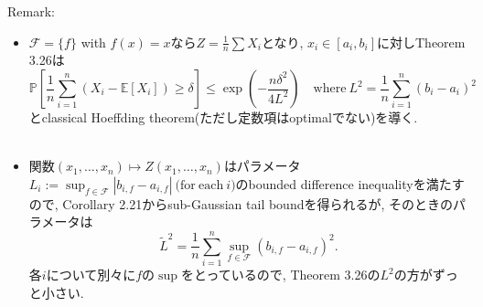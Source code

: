 \documentclass[aspectratio=169, dvipdfmx]{beamer}
\newcommand{\ex}{\mathbb{E}}
\newcommand{\bb}{\mathbb}
\newcommand{\cc}{\mathcal}
\begin{document}
\begin{frame}
    Remark:
    \begin{itemize}
        \item $\cc{F} = \{f\}$ with $f(x) = x$なら$Z = \frac{1}{n}\sum X_i$となり,
        $x_i \in [a_i, b_i]$に対しTheorem 3.26は
        \[
            \bb{P} \left[\frac{1}{n}\sum_{i=1}^n (X_i - \ex[X_i]) \ge \delta\right]
            \le \exp\left(-\frac{n\delta^2}{4L^2}\right)
            \quad \mathrm{where\ } L^2 = \frac{1}{n}\sum_{i=1}^n (b_i-a_i)^2
        \]
        とclassical Hoeffding theorem(ただし定数項はoptimalでない)を導く.\\
        　
        \item 関数$(x_1, \dots, x_n) \mapsto Z(x_1,\dots,x_n)$はパラメータ$L_i := \sup_{f \in \cc{F}}|b_{i,f}-a_{i,f}|\ \mathrm{(for\ each\ } i\mathrm{)}$のbounded difference inequalityを満たすので,
        Corollary 2.21からsub-Gaussian tail boundを得られるが, そのときのパラメータは
        \[
            \tilde{L}^2 
            = \frac{1}{n}\sum_{i=1}^n \sup_{f \in \cc{F}} (b_{i,f} - a_{i,f})^2.
        \]
        各$i$について別々に$f$の$\sup$をとっているので, Theorem 3.26の$L^2$の方がずっと小さい.
    \end{itemize}
\end{frame}
\end{document}
